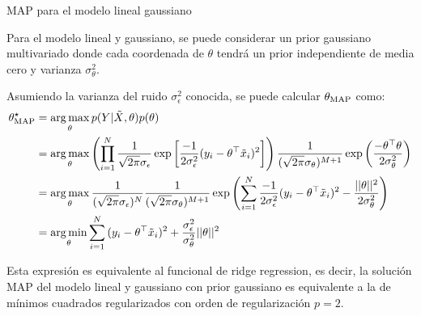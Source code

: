 \documentclass[9pt]{beamer}
\begin{document}
\begin{frame}{MAP para el modelo lineal gaussiano}

Para el modelo lineal y gaussiano, se puede considerar un prior gaussiano multivariado donde cada coordenada de $\theta$ tendrá un prior independiente de media cero y varianza $\sigma_\theta^2$.\\ \pause

Asumiendo la varianza del ruido $\sigma_\epsilon^2$ conocida, se puede calcular $\theta_\text{MAP}$ como:
\begin{align}
	\theta_\text{MAP}^\star 	&= \operatorname*{arg\,max}_\theta p(Y|\tilde{X},\theta)p(\theta)\nonumber\\
	&= \operatorname*{arg\,max}_\theta \left(\prod_{i=1}^N \frac{1}{\sqrt{2\pi}\sigma_\epsilon} \exp\left[{\frac{-1}{2\sigma_\epsilon^2}(y_i-\theta^\top\tilde{x}_i)^2}\right]\right)									\frac{1}{(\sqrt{2\pi}\sigma_\theta)^{M+1}} \exp\left({\frac{-\theta^\top\theta}{2\sigma_\theta^2}}\right) \nonumber\\
	&= \operatorname*{arg\,max}_\theta  \frac{1}{(\sqrt{2\pi}\sigma_\epsilon)^N} \frac{1}{(\sqrt{2\pi}\sigma_\theta)^{M+1}} \exp\left( \sum_{i=1}^N{\frac{-1}{2\sigma_\epsilon^2}(y_i-\theta^\top\tilde{x}_i)^2} -{\frac{||\theta||^2}{2\sigma_\theta^2}}\right) \nonumber\\
	&= \operatorname*{arg\,min}_\theta \sum_{i=1}^N{(y_i-\theta^\top\tilde{x}_i)^2} +{\frac{\sigma_\epsilon^2}{\sigma_\theta^2}||\theta||^2}\nonumber
\end{align}\pause

Esta expresión es equivalente al funcional de ridge regression, es decir, la solución MAP del modelo lineal y gaussiano con prior gaussiano es equivalente a la de mínimos cuadrados regularizados con orden de  regularización $p=2$.\\

\end{frame}
\end{document}
